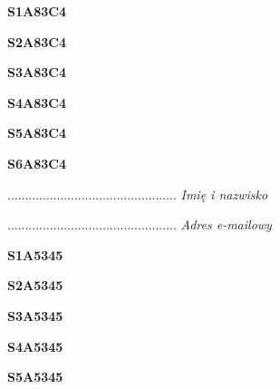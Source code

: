 \begin{turn}{90}\huge \textbf{S1A83C4}\end{turn}

\begin{turn}{90}\huge \textbf{S2A83C4}\end{turn}

\begin{turn}{90}\huge \textbf{S3A83C4}\end{turn}

\begin{turn}{90}\huge \textbf{S4A83C4}\end{turn}

\begin{turn}{90}\huge \textbf{S5A83C4}\end{turn}

\begin{turn}{90}\huge \textbf{S6A83C4}\end{turn}

\begin{turn}{90}\begin{minipage}{\linewidth} \vspace{20mm} ................................................  \textit{Imię i nazwisko}\end{minipage}\end{turn}

\begin{turn}{90}\begin{minipage}{\linewidth} \vspace{20mm} ................................................  \textit{Adres e-mailowy}\end{minipage}\end{turn}

\begin{turn}{90}\huge \textbf{S1A5345}\end{turn}

\begin{turn}{90}\huge \textbf{S2A5345}\end{turn}

\begin{turn}{90}\huge \textbf{S3A5345}\end{turn}

\begin{turn}{90}\huge \textbf{S4A5345}\end{turn}

\begin{turn}{90}\huge \textbf{S5A5345}\end{turn}

